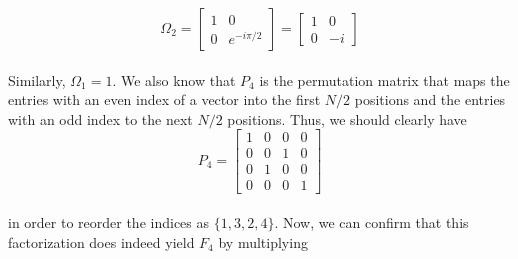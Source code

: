\documentclass{article}
\begin{document}
\[
\Omega_2=\left[\begin{array}{cc} 1&0\\0&e^{-i\pi/2}\end{array}
\right]=\left[\begin{array}{cc} 1&0\\0&-i\end{array}
\right]
\]\\
Similarly, $\Omega_1=1$. We also know that $P_4$ is the permutation matrix that maps the entries with an even index of a vector into the first $N/2$ positions and the entries with an odd index to the next $N/2$ positions. Thus, we should clearly have
\[
P_4=\left[ \begin{array}{cccc}1&0&0&0\\
0&0&1&0\\
0&1&0&0\\
0&0&0&1\end{array}\right]
\]\\
in order to reorder the indices as $\{1,3,2,4\}$. Now, we can confirm that this factorization does indeed yield $F_4$ by multiplying
\end{document}
